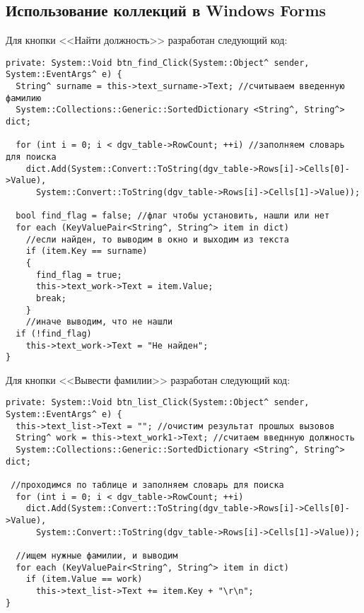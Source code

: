 \subsection*{Использование коллекций в Windows Forms}
Для кнопки <<Найти должность>> разработан следующий код:
\begin{verbatim}
private: System::Void btn_find_Click(System::Object^ sender, System::EventArgs^ e) {
  String^ surname = this->text_surname->Text; //считываем введенную фамилию
  System::Collections::Generic::SortedDictionary <String^, String^> dict;

  for (int i = 0; i < dgv_table->RowCount; ++i) //заполняем словарь для поиска
    dict.Add(System::Convert::ToString(dgv_table->Rows[i]->Cells[0]->Value),
      System::Convert::ToString(dgv_table->Rows[i]->Cells[1]->Value));

  bool find_flag = false; //флаг чтобы установить, нашли или нет
  for each (KeyValuePair<String^, String^> item in dict)
    //если найден, то выводим в окно и выходим из текста
    if (item.Key == surname)
    {
      find_flag = true;
      this->text_work->Text = item.Value;
      break;
    }
    //иначе выводим, что не нашли
  if (!find_flag)
    this->text_work->Text = "Не найден";
}
\end{verbatim}

Для кнопки <<Вывести фамилии>> разработан следующий код:
\begin{verbatim}
private: System::Void btn_list_Click(System::Object^ sender, System::EventArgs^ e) {
  this->text_list->Text = ""; //очистим результат прошлых вызовов
  String^ work = this->text_work1->Text; //считаем введнную должность
  System::Collections::Generic::SortedDictionary <String^, String^> dict;

 //проходимся по таблице и заполняем словарь для поиска
  for (int i = 0; i < dgv_table->RowCount; ++i)
    dict.Add(System::Convert::ToString(dgv_table->Rows[i]->Cells[0]->Value),
      System::Convert::ToString(dgv_table->Rows[i]->Cells[1]->Value));

  //ищем нужные фамилии, и выводим
  for each (KeyValuePair<String^, String^> item in dict)
    if (item.Value == work)
      this->text_list->Text += item.Key + "\r\n";
}
\end{verbatim}

